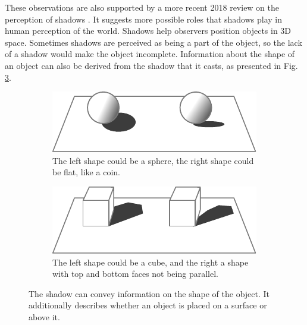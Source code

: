 These observations are also supported by a more recent 2018 review on the perception of shadows \cite{bib:article:shadow_perception}. It suggests more possible roles that shadows play in human perception of the world. Shadows help observers position objects in 3D space. Sometimes shadows are perceived as being a part of the object, so the lack of a shadow would make the object incomplete. Information about the shape of an object can also be derived from the shadow that it casts, as presented in Fig. \ref{fig:shadow_shape_example}.

\begin{figure}[h]
    \centering
    \begin{subfigure}{0.4\textwidth}
        \includegraphics[width=\textwidth]{./graf/shadow_example_shadow_shape_1.pdf}
        \caption{The left shape could be a sphere, the right shape could be flat, like a coin.}
        \label{fig:shadow_shape_1}
    \end{subfigure}
    \hfill
    \begin{subfigure}{0.4\textwidth}
        \includegraphics[width=\textwidth]{./graf/shadow_example_shadow_shape_2.pdf}
        \caption{The left shape could be a cube, and the right a shape with top and bottom faces not being parallel.}
        \label{fig:shadow_shape_2}
    \end{subfigure}

    \caption{The shadow can convey information on the shape of the object. It additionally describes whether an object is placed on a surface or above it.}
    \label{fig:shadow_shape_example}
\end{figure}

